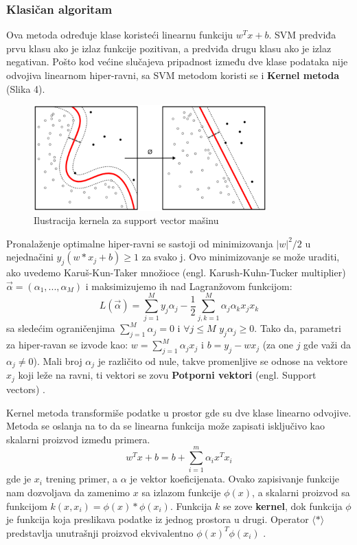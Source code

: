 \documentclass[12pt, letterpaper, oneside]{article}
\begin{document}
\subsubsection{Klasičan algoritam}
Ova metoda određuje klase koristeći linearnu funkciju $w^{T}x + b$. SVM predviđa prvu klasu ako je izlaz funkcije pozitivan, a predviđa drugu klasu ako je izlaz negativan.
Pošto kod većine slučajeva pripadnost između dve klase podataka nije odvojiva linearnom hiper-ravni, sa SVM metodom koristi se i \textbf{Kernel metoda} (Slika 4).

\begin{figure}[ht]
    \centering
    \includegraphics[width=0.8\textwidth]{files/512px-Kernel_Machine.png}
    \caption{Ilustracija kernela za support vector mašinu \cite{SvmImage}}
\end{figure}

Pronalaženje optimalne hiper-ravni se sastoji od minimizovanja $|w|^{2}/2$ u nejednačini $y_j(w*x_j+b) \geq 1$ za svako j. 
Ovo minimizovanje se može uraditi, ako uvedemo Karuš-Kun-Taker množioce (engl. Karush-Kuhn-Tucker multiplier) $\overrightarrow{\alpha} = (\alpha_1,...,\alpha_M)$ i maksimizujemo ih nad Lagranžovom funkcijom:
\[
    L(\overrightarrow{\alpha}) = \sum_{j=1}^{M}{y_j\alpha_j} - \frac{1}{2}\sum_{j,k=1}^{M}{\alpha_j\alpha_kx_jx_k}
\]
sa sledećim ograničenjima $\sum_{j=1}^{M}{\alpha_j=0}$ i $\forall j \leq M $ $y_j\alpha_j \geq 0$. Tako da, parametri za hiper-ravan se izvode kao:
$w = \sum_{j=1}^{M}\alpha_jx_j$ i $b = y_j - wx_j$ (za one $j$ gde važi da $\alpha_j \neq 0$). Mali broj $\alpha_j$ je različito od nule, takve promenljive se odnose na vektore $x_j$ koji leže na ravni,
ti vektori se zovu \textbf{Potporni vektori} (engl. Support vectors) \cite{rebentrost2014quantum}.

Kernel metoda transformiše podatke u prostor gde su dve klase linearno odvojive. Metoda se oslanja na to da se linearna funkcija
može zapisati isključivo kao skalarni proizvod između primera.
\[
    w^{T}x + b = b + \sum_{i=1}^m \alpha_i x^T x_i
\]
gde je $x_i$ trening primer, a $\alpha$ je vektor koeficijenata. Ovako zapisivanje funkcije nam dozvoljava da zamenimo $x$ sa izlazom funkcije $\phi(x)$, a skalarni proizvod sa funkcijom $k(x,x_i) = \phi(x)*\phi(x_i)$.
Funkcija $k$ se zove \textbf{kernel}, dok funkcija $\phi$ je funkcija koja preslikava podatke iz jednog prostora u drugi. Operator $\langle * \rangle$ predstavlja unutrašnji proizvod ekvivalentno $\phi(x)^T\phi(x_i)$ \cite{goodfellow2016deep}.
\end{document}
